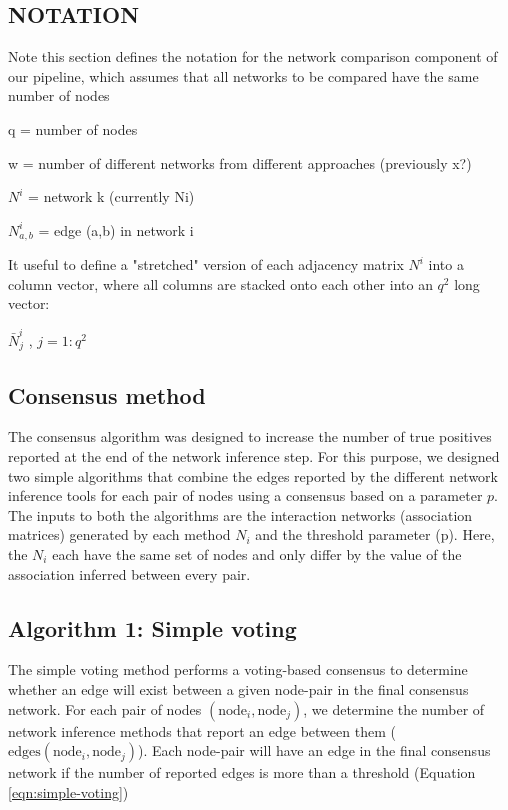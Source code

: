  \subsection*{NOTATION}

  Note this section defines the notation for the network comparison component of our pipeline, which assumes that all networks to be compared have the same number of nodes

  q = number of nodes

  w = number of different networks from different approaches (previously x?)

  $N^i$ = network k (currently Ni)

  $N^i_{a,b}$ = edge (a,b) in network i

  It useful to define a "stretched" version of each adjacency matrix $N^i$ into a column vector, where all columns are stacked onto each other into an $q^2$ long vector:

  $\bar{N}^i_{j}$ , $j=1:q^2$

  \subsection*{Consensus method}
  \vspace{-5mm}

  The consensus algorithm was designed to increase the number of true positives reported at the end of the network inference step. For this purpose, we designed two simple algorithms that combine the edges reported by the different network inference tools for each pair of nodes using a consensus based on a parameter \(p\). The inputs to both the algorithms are the interaction networks (association matrices) generated by each method \(N_{i}\) and the threshold parameter (p). Here, the \(N_{i}\) each have the same set of nodes and only differ by the value of the association inferred between every pair.

  \subsection*{Algorithm 1: Simple voting}


  The simple voting method performs a voting-based consensus to determine whether an edge will exist between a given node-pair in the final consensus network. For each pair of nodes \((\text{node}_{i}, \text{node}_{j})\), we determine the number of network inference methods that report an edge between them  (\(\text{edges}(\text{node}_{i}, \text{node}_{j})\)). Each node-pair will have an edge in the final consensus network if the number of reported edges is more than a threshold (Equation \ref{eqn:simple-voting})

